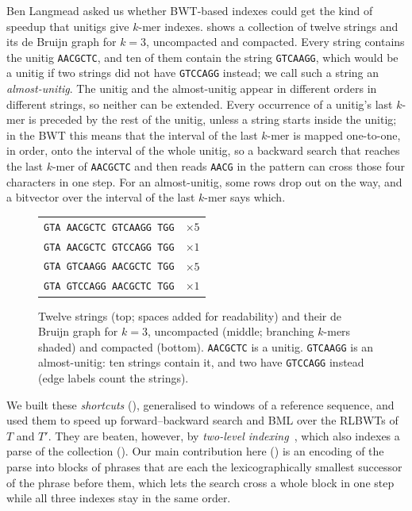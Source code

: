 Ben Langmead asked us whether BWT-based indexes could get the kind of
speedup that unitigs give $k$-mer indexes.  shows a collection of twelve strings
and its de Bruijn graph for $k = 3$, uncompacted and compacted. Every
string contains the unitig \texttt{AACGCTC}, and ten of them contain
the string \texttt{GTCAAGG}, which would be a unitig if two strings did
not have \texttt{GTCCAGG} instead; we call such a string an
\emph{almost-unitig}. The unitig and the almost-unitig appear in
different orders in different strings, so neither can be extended.
Every occurrence of a unitig's last $k$-mer is preceded by the rest of
the unitig, unless a string starts inside the unitig; in the BWT this means
that the interval of the last $k$-mer is mapped one-to-one, in order,
onto the interval of the whole unitig, so a backward search that reaches
the last $k$-mer of \texttt{AACGCTC} and then reads \texttt{AACG} in the
pattern can cross those four characters in one step. For an
almost-unitig, some rows drop out on the way, and a bitvector over the
interval of the last $k$-mer says which.

\begin{figure}[t]
  \centering
  \small
  \begin{tabular}{@{}l r@{}}
    \texttt{GTA\,AACGCTC\,GTCAAGG\,TGG} & $\times 5$ \\
    \texttt{GTA\,AACGCTC\,GTCCAGG\,TGG} & $\times 1$ \\
    \texttt{GTA\,GTCAAGG\,AACGCTC\,TGG} & $\times 5$ \\
    \texttt{GTA\,GTCCAGG\,AACGCTC\,TGG} & $\times 1$
  \end{tabular}

  \medskip
  

  \medskip
  
  \caption{Twelve strings (top; spaces added for readability) and their
    de Bruijn graph for $k = 3$, uncompacted (middle; branching
    $k$-mers shaded) and compacted (bottom). \texttt{AACGCTC} is a
    unitig. \texttt{GTCAAGG} is an almost-unitig: ten strings contain
    it, and two have \texttt{GTCCAGG} instead (edge labels count the
    strings).}
  \label{fig:dbg}
\end{figure}

We built these \emph{shortcuts} (), generalised to
windows of a reference sequence, and used them to speed up
forward--backward search and BML over the RLBWTs of $T$ and $T'$. They
are beaten, however, by \emph{two-level
indexing}~\cite{BrownEtAlRLCSA,HongEtAl2024,DengEtAl2022}, which also
indexes a parse of the collection (). Our main
contribution here () is an encoding of the parse into
blocks of phrases that are each the lexicographically smallest
successor of the phrase before them, which lets the search cross a
whole block in one step while all three indexes stay in the same order.

